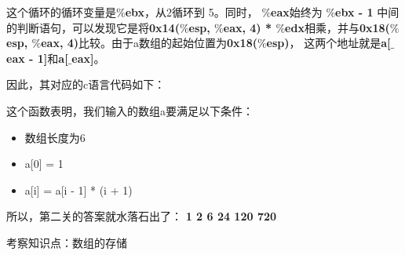 	这个循环的循环变量是\textbf{$\%$ebx}，从2循环到 5。同时， \textbf{$\%$eax}始终为
\textbf{$\%$ebx - 1}
	中间的判断语句，可以发现它是将\textbf{0x14($\%$esp, $\%$eax, 4) * $\%$edx}相乘，并与\textbf{0x18($\%$esp, $\%$eax, 4)}比较。由于a数组的起始位置为\textbf{0x18($\%$esp)}， 这两个地址就是\textbf{a[$\_$eax - 1]}和\textbf{a[$\_$eax]}。

	因此，其对应的c语言代码如下：

	
	
	这个函数表明，我们输入的数组a要满足以下条件：
	\begin{itemize}
		\item	数组长度为6
		\item	a[0] = 1
		\item	a[i] = a[i - 1] * (i + 1)
	\end{itemize}

	所以，第二关的答案就水落石出了： \textbf{1 2 6 24 120 720}
	
	考察知识点：数组的存储	